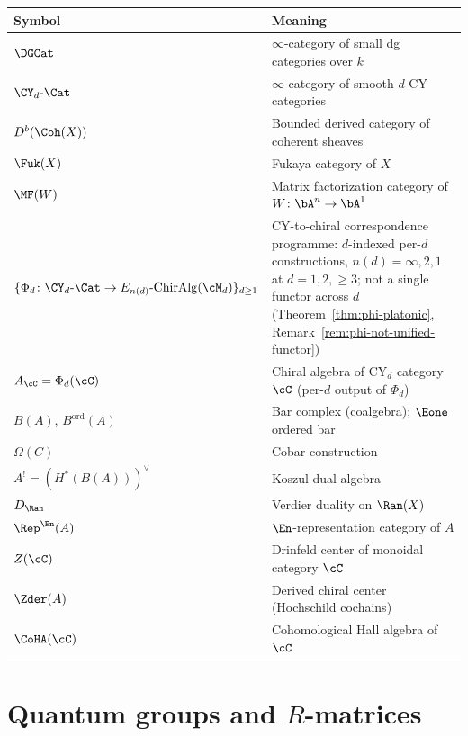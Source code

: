 \begin{center}
\begin{tabular}{@{}ll@{}}
\toprule
\textbf{Symbol} & \textbf{Meaning} \\
\midrule
$\DGCat$ & $\infty$-category of small dg categories over $k$ \\
$\CY_d\text{-}\Cat$ & $\infty$-category of smooth $d$-CY categories \\
$D^b(\Coh(X))$ & Bounded derived category of coherent sheaves \\
$\Fuk(X)$ & Fukaya category of $X$ \\
$\MF(W)$ & Matrix factorization category of $W\colon \bA^n \to \bA^1$ \\
$\{\Phi_d\colon \CY_d\text{-}\Cat \to E_{n(d)}\text{-}\mathrm{ChirAlg}(\cM_d)\}_{d \ge 1}$ & CY-to-chiral correspondence programme: $d$-indexed per-$d$ constructions, $n(d) = \infty, 2, 1$ at $d = 1, 2, \ge 3$; not a single functor across $d$ (Theorem~\ref{thm:phi-platonic}, Remark~\ref{rem:phi-not-unified-functor}) \\
$A_\cC = \Phi_d(\cC)$ & Chiral algebra of CY$_d$ category $\cC$ (per-$d$ output of $\Phi_d$) \\
$B(A)$, $B^{\mathrm{ord}}(A)$ & Bar complex (coalgebra); $\Eone$ ordered bar \\
$\Omega(C)$ & Cobar construction \\
$A^! = (H^*(B(A)))^\vee$ & Koszul dual algebra \\
$D_{\Ran}$ & Verdier duality on $\Ran(X)$ \\
$\Rep^{\En}(A)$ & $\En$-representation category of $A$ \\
$Z(\cC)$ & Drinfeld center of monoidal category $\cC$ \\
$\Zder(A)$ & Derived chiral center (Hochschild cochains) \\
$\CoHA(\cC)$ & Cohomological Hall algebra of $\cC$ \\
\bottomrule
\end{tabular}
\end{center}

\section{Quantum groups and \texorpdfstring{$R$}{R}-matrices}
\label{sec:notation-qg}


